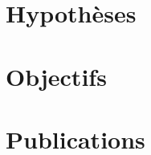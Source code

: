 

  \section{Hypothèses}
  \label{sec:main-introduction-hypothesis}


  \section{Objectifs}
  \label{sec:main-introduction-goals}


  \section{Publications}
  \label{sec:main-introduction-publications}

